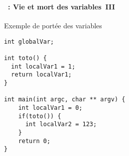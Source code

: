 \begin{frame}[containsverbatim]
  \frametitle{\secname}
  \framesubtitle{\subsecname~: Vie et mort des variables~III}
  
  \begin{block}{Exemple de portée des variables}
    \begin{verbatim}  
int globalVar;

int toto() {
  int localVar1 = 1;
  return localVar1;
}

int main(int argc, char ** argv) {
    int localVar1 = 0;
    if(toto()) {
      int localVar2 = 123;
    }
    return 0;
}\end{verbatim}
  \end{block}
\end{frame}

